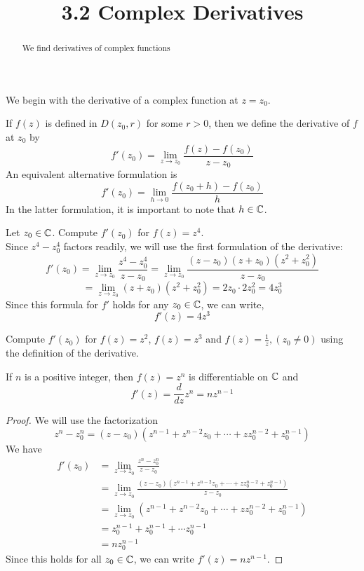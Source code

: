 \documentclass[handout]{ximera}
\title{3.2 Complex Derivatives}
\begin{document}
\begin{abstract}
We find derivatives of complex functions
\end{abstract}

\maketitle



We begin with the derivative of a complex function at $z = z_0$.

\begin{definition}
If $f(z)$ is defined in $D(z_0, r)$ for some $r>0$, then we define the derivative of $f$ at $z_0$ by
\[
f'(z_0) = \lim_{z \to z_0} \frac{f(z) - f(z_0)}{z-z_0}
\]
An equivalent alternative formulation is 
\[
f'(z_0) = \lim_{h \to 0} \frac{f(z_0 +h) -f(z_0)}{h}
\]
In the latter formulation, it is important to note that $h\in  \mathbb C$.
\end{definition}

\begin{example}
Let $z_0 \in \mathbb C$. Compute $f'(z_0)$ for $f(z) = z^4$.\\
Since $z^4 - z_0^4$ factors readily, we will use the first formulation of the derivative:
\[
f'(z_0) =\lim_{z \to z_0} \frac{z^4 - z_0^4}{z-z_0} =\lim_{z \to z_0} \frac{(z-z_0)(z+z_0)(z^2+z_0^2)}{z-z_0}
\]
\[
= \lim_{z \to z_0} (z+z_0)(z^2+z_0^2) = 2z_0\cdot 2z_0^2 = 4z_0^3
\]
Since this formula for $f'$ holds for any $z_0 \in \mathbb C$, we can write,
\[
f'(z) = 4z^3
\]
\end{example}


\begin{problem}
Compute $f'(z_0)$ for $f(z) = z^2$, $f(z) = z^3$ and $f(z) = \frac{1}{z}, (z_0 \neq 0)$ using the definition of the derivative.
\end{problem}

\begin{proposition}
If $n$ is a positive integer, then $f(z) = z^n$ is differentiable on $\mathbb C$ and
\[
f'(z) = \frac{d}{dz} z^n = nz^{n-1}
\]
\end{proposition}

\begin{proof}
We will use the factorization
\[
z^n - z_0^n = (z-z_0)\left(z^{n-1} + z^{n-2}z_0 + \cdots + zz_0^{n-2} + z_0^{n-1} \right)
\]
We have
\begin{align*}
f'(z_0) &= \lim_{z \to z_0} \frac{z^n - z_0^n}{z-z_0} \\
        &=\lim_{z \to z_0} \frac{(z-z_0)\left(z^{n-1} + z^{n-2}z_0 + \cdots + zz_0^{n-2} + z_0^{n-1} \right)}{z-z_0} \\
        &= \lim_{z \to z_0} \left(z^{n-1} + z^{n-2}z_0 + \cdots + zz_0^{n-2} + z_0^{n-1} \right)\\
        & = z_0^{n-1} + z_0^{n-1} + \cdots z_0^{n-1}\\
        & = nz_0^{n-1}
\end{align*}
Since this holds for all $z_0 \in \mathbb C$, we can write $f'(z) = nz^{n-1}$.

\end{proof}
\end{document}
